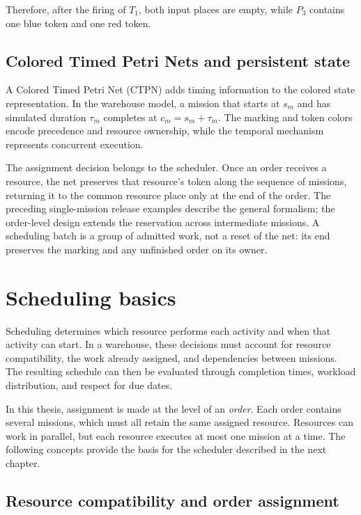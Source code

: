 \noindent Therefore, after the firing of $T_1$, both input places are empty, while $P_3$ contains one blue token and one red token.

\subsection{Colored Timed Petri Nets and persistent state}
\label{sec:theory-ctpn}

A Colored Timed Petri Net (CTPN) adds timing information to the colored
state representation. In the warehouse model, a mission that starts at
$s_m$ and has simulated duration $\tau_m$ completes at $c_m=s_m+\tau_m$.
The marking and token colors encode precedence and resource ownership,
while the temporal mechanism represents concurrent execution.

The assignment decision belongs to the scheduler. Once an order receives
a resource, the net preserves that resource's token along the sequence of
missions, returning it to the common resource place only at the end of the
order. The preceding single-mission release examples describe the general
formalism; the order-level design extends the reservation across intermediate
missions. A scheduling batch is a group of admitted work, not a reset of the
net: its end preserves the marking and any unfinished order on its owner.


\section{Scheduling basics}
\label{sec:scheduling-basics}

Scheduling determines which resource performs each activity and when that
activity can start. In a warehouse, these decisions must account for resource
compatibility, the work already assigned, and dependencies between missions.
The resulting schedule can then be evaluated through completion times, workload
distribution, and respect for due dates.

In this thesis, assignment is made at the level of an \textit{order}. Each order
contains several missions, which must all retain the same assigned resource.
Resources can work in parallel, but each resource executes at most one mission
at a time. The following concepts provide the basis for the scheduler described
in the next chapter.

\subsection{Resource compatibility and order assignment}
\label{sec:theory-eligibility}

